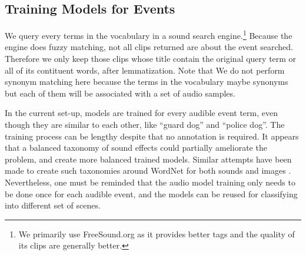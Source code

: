 \subsection{Training Models for Events}
\label{sec:collect-audio}
We query every terms in the vocabulary in a sound search
engine.\footnote{We primarily use FreeSound.org as it provides
better tags and the quality of its clips are generally better.}
Because the engine does fuzzy matching,
not all clips returned are about the event searched.
Therefore we only keep those clips whose title contain the original
query term or all of its contituent words, after lemmatization.
Note that We do not perform synonym matching here because the terms
in the vocabulary maybe synonyms but each of them will be associated with
a set of audio samples.

In the current set-up, models are trained for every audible event term,
even though they are similar to each other, like ``guard dog'' and ``police
dog''. The training process can be lengthy despite that no annotation is
required. It appears that a balanced taxonomy of sound effects could
partially ameliorate the problem, and create more balanced trained models.
Similar attempts have been made to create such taxonomies around
WordNet for both sounds \cite{Cano2004:tax} and images \cite{deng2009imagenet}.
Nevertheless, one must be reminded that the audio model training  only needs
to be done once for each audible event, and the models can be reused
for classifying into different set of scenes.

%
%
%

